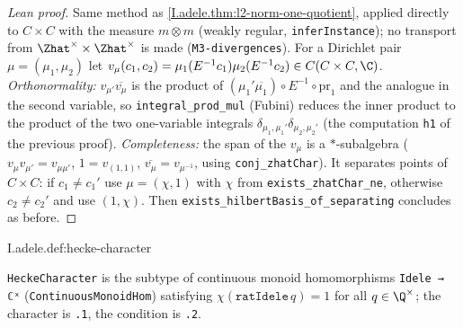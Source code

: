 \begin{proof}[Lean proof]
Same method as \cref{I.adele.thm:l2-norm-one-quotient}, applied directly to $C\times C$ with the measure $m\otimes m$ (weakly regular, \texttt{inferInstance}); no transport from $\Zhat^\times\times\Zhat^\times$ is made (\texttt{M3-divergences}). For a Dirichlet pair $\mu=(\mu_1,\mu_2)$ let $v_\mu(c_1,c_2)=\mu_1(E^{-1}c_1)\mu_2(E^{-1}c_2)\in C(C\times C,\C)$. \emph{Orthonormality:} $v_{\mu'}\overline{v_\mu}$ is the product of $(\mu_1'\overline{\mu_1})\circ E^{-1}\circ\mathrm{pr}_1$ and the analogue in the second variable, so \texttt{integral\_prod\_mul} (Fubini) reduces the inner product to the product of the two one-variable integrals $\delta_{\mu_1,\mu_1'}\delta_{\mu_2,\mu_2'}$ (the computation \texttt{h1} of the previous proof). \emph{Completeness:} the span of the $v_\mu$ is a $*$-subalgebra ($v_\mu v_{\mu'}=v_{\mu\mu'}$, $1=v_{(1,1)}$, $\overline{v_\mu}=v_{\mu^{-1}}$, using \texttt{conj\_zhatChar}). It separates points of $C\times C$: if $c_1\ne c_1'$ use $\mu=(\chi,1)$ with $\chi$ from \texttt{exists\_zhatChar\_ne}, otherwise $c_2\ne c_2'$ and use $(1,\chi)$. Then \texttt{exists\_hilbertBasis\_of\_separating} concludes as before.
\end{proof}

\begin{definition}
\end{definition}
\begin{tfformal}{I.adele.def:hecke-character}
\begin{tffidelity}
\texttt{HeckeCharacter} is the subtype of continuous monoid homomorphisms \texttt{Idele → ℂˣ} (\texttt{ContinuousMonoidHom}) satisfying $\chi(\texttt{ratIdele}\,q)=1$ for all $q\in\Q^\times$; the character is \texttt{.1}, the condition is \texttt{.2}.
\end{tffidelity}
\end{tfformal}

